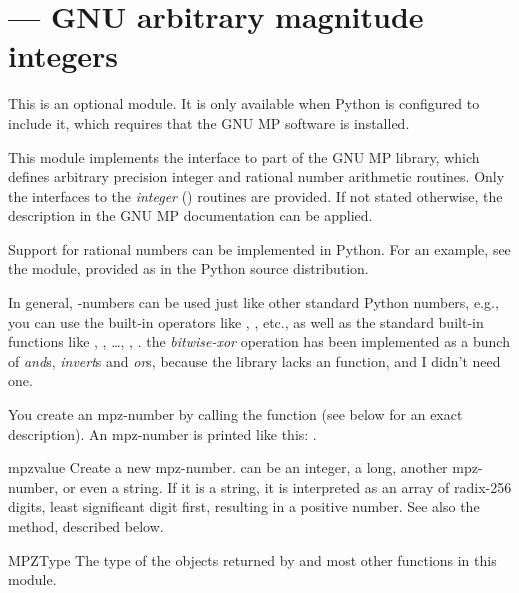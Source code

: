 \section{ ---
         GNU arbitrary magnitude integers}



This is an optional module.  It is only available when Python is
configured to include it, which requires that the GNU MP software is
installed.

This module implements the interface to part of the GNU MP library,
which defines arbitrary precision integer and rational number
arithmetic routines.  Only the interfaces to the \emph{integer}
() routines are provided. If not stated
otherwise, the description in the GNU MP documentation can be applied.

Support for rational numbers can be
implemented in Python.  For an example, see the %
 module, provided as
 in the Python source distribution.

In general, -numbers can be used just like other standard
Python numbers, e.g., you can use the built-in operators like \code{+},
\code{*}, etc., as well as the standard built-in functions like
, , \ldots, ,
.   the \emph{bitwise-xor}
operation has been implemented as a bunch of \emph{and}s,
\emph{invert}s and \emph{or}s, because the library lacks an
 function, and I didn't need one.

You create an mpz-number by calling the function  (see
below for an exact description). An mpz-number is printed like this:
.


\begin{funcdesc}{mpz}{value}
  Create a new mpz-number.  can be an integer, a long,
  another mpz-number, or even a string. If it is a string, it is
  interpreted as an array of radix-256 digits, least significant digit
  first, resulting in a positive number. See also the 
  method, described below.
\end{funcdesc}

\begin{datadesc}{MPZType}
  The type of the objects returned by  and most other
  functions in this module.
\end{datadesc}


